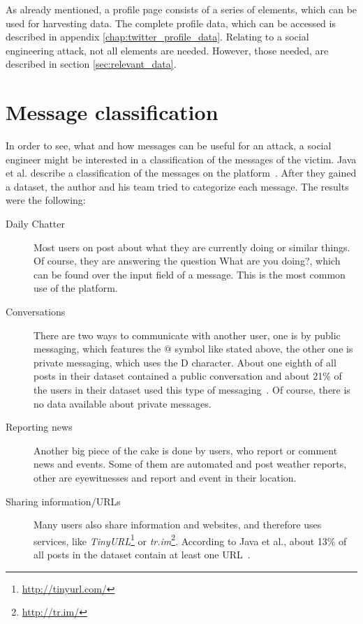 As already mentioned, a \Twitter{} profile page consists of a series of
elements, which can be used for harvesting data. The complete profile data,
which can be accessed is described in appendix
\ref{chap:twitter_profile_data}. Relating to a social engineering attack,
not all elements are needed. However, those needed, are described in section
\ref{sec:relevant_data}.

\section{Message classification}

In order to see, what and how messages can be useful for an attack, a social
engineer might be interested in a classification of the messages of the victim.
Java et al. describe a classification of the messages on the \Twitter{}
platform~\cite{java2007}. After they gained a dataset, the author and his team
tried to categorize each message. The results were the following:

\begin{description}

\item[Daily Chatter]
Most users on \Twitter{} post about what they are currently doing or similar
things. Of course, they are answering the question \glqq{}What are you
doing?\grqq{}, which can be found over the input field of a message. This is
the most common use of the \Twitter{} platform.

\item[Conversations]
There are two ways to communicate with another user, one is by public
messaging, which features the @ symbol like stated above, the other one is
private messaging, which uses the D character. About one eighth of all posts
in their dataset contained a public conversation and about 21\% of the users in
their dataset used this type of messaging~\cite{java2007}. Of course, there is
no data available about private messages.

\item[Reporting news]
Another big piece of the cake is done by users, who report or comment news and
events. Some of them are automated and post weather reports, other are
eyewitnesses and report and event in their location.

\item[Sharing information/URLs]
Many users also share information and websites, and therefore uses services,
like \textit{TinyURL}\footnote{\url{http://tinyurl.com/}} or
\textit{tr.im}\footnote{\url{http://tr.im/}}. According to Java et al.,
about 13\% of all posts in the dataset contain at least one URL~\cite{java2007}.

\end{description}


